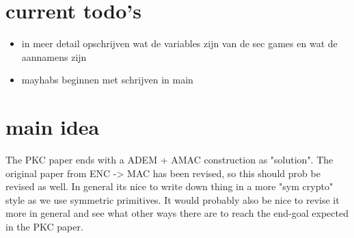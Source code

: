 \documentclass{article}
\begin{document}
\newpage
\section{current todo's}
\begin{itemize}
    \item in meer detail opschrijven wat de variables zijn van de sec games en wat de aannamens zijn
    \item mayhabs beginnen met schrijven in main
\end{itemize}
\newpage
\section{main idea}
The PKC paper ends with a ADEM + AMAC construction as "solution". The original paper from ENC -> MAC has been revised, so this should prob be revised as well. In general its nice to write down thing in a more "sym crypto" style as we use symmetric primitives. It would probably also be nice to revise it more in general and see what other ways there are to reach the end-goal expected in the PKC paper.
\end{document}

